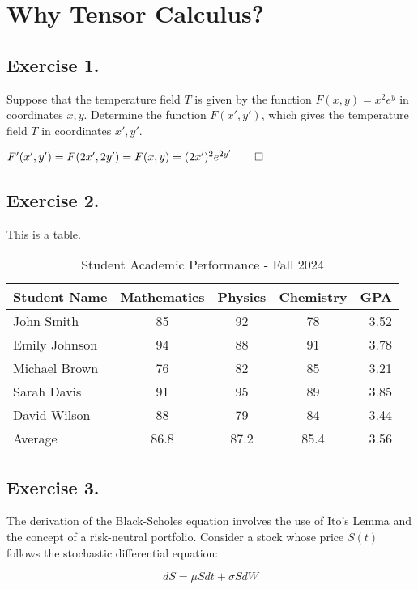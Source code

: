 \documentclass[../main.tex]{subfiles}
\begin{document}
\section{Why Tensor Calculus?}
\subsection{Exercise 1.}
Suppose that the temperature field $T$ is given by the function $F(x,y)=x^2e^y$ in coordinates $x, y$. Determine the function $F(x',y')$, which gives the temperature field $T$ in coordinates $x',y'$.

\sol

$F'(x',y')=F(2x',2y')=F(x,y)=(2x')^2e^{2y'}\qed$

\subsection{Exercise 2.}

This is a table.

\begin{table}[h]
    \centering
    \caption{Student Academic Performance - Fall 2024}
    \label{tab:student_performance}
    \begin{tabular}{@{}lcccr@{}}
        \toprule
        Student Name & Mathematics & Physics & Chemistry & GPA \\
        \midrule
        John Smith & 85 & 92 & 78 & 3.52 \\
        Emily Johnson & 94 & 88 & 91 & 3.78 \\
        Michael Brown & 76 & 82 & 85 & 3.21 \\
        Sarah Davis & 91 & 95 & 89 & 3.85 \\
        David Wilson & 88 & 79 & 84 & 3.44 \\
        \midrule
        Average & 86.8 & 87.2 & 85.4 & 3.56 \\
        \bottomrule
    \end{tabular}
\end{table}

\subsection{Exercise 3.}
The derivation of the Black-Scholes equation involves the use of Ito's Lemma and the concept of a risk-neutral portfolio. Consider a stock whose price \( S(t) \) follows the stochastic differential equation:

\begin{equation}
    dS = \mu S dt + \sigma S dW
\end{equation}
\end{document}
